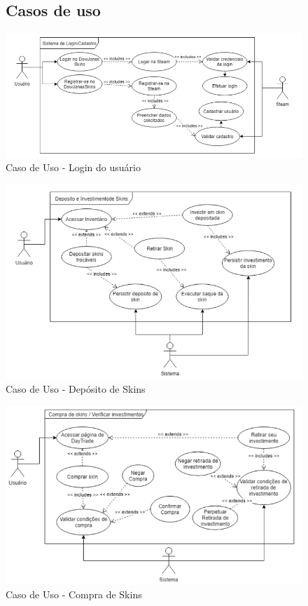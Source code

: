   \begin{figure}[!htb]
 \subsection{Casos de uso}
        \centering
        \includegraphics[scale=0.6]{Imagens/login.png}
        \caption{Caso de Uso - Login do usuário}
 \end{figure}

  \begin{figure}[!htb]
        \centering
        \includegraphics[scale=0.6]{Imagens/deposito.png}
        \caption{Caso de Uso - Depósito de Skins}
 \end{figure}

  \begin{figure}[!htb]
        \centering
        \includegraphics[scale=0.6]{Imagens/compra.png}
        \caption{Caso de Uso - Compra de Skins}
 \end{figure}

